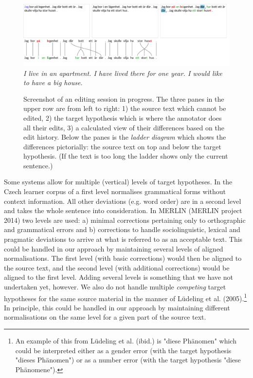 \documentclass[10pt, a4paper]{article}
\begin{document}
\begin{figure}
\includegraphics[width=\textwidth, trim={0 1cm 0 0}, clip]{screenshot.pdf}
\emph{\small I live in an apartment. I have lived there for one year. I would like to have a big house.}
\caption{Screenshot of an editing session in progress. The three panes in the upper row are from left to right:
1) the source text which cannot be edited,
2) the target hypothesis which is where the annotator does all their edits,
3) a calculated view of their differences based on the edit history.
Below the panes is the \emph{ladder diagram} which shows the differences
pictorially: the source text on top and below the target hypothesis.
(If the text is too long the ladder shows only the current sentence.)
\label{fig:screenshot}
}
\end{figure}

Some systems allow for multiple (vertical) levels of target hypotheses. In the Czech learner corpus of \cite{Hana2014} a
first level normalises grammatical forms without context information. All other deviations (e.g. word order) are in a second level and takes the whole sentence into consideration.
In MERLIN (MERLIN project 2014) two levels are used: a) minimal corrections pertaining only to orthographic and grammatical errors and b) corrections to handle sociolinguistic, lexical and pragmatic deviations to arrive at what is referred to as an acceptable text. This could be handled in our approach by maintaining several levels of aligned normalisations. The first level (with basic corrections) would then be aligned to the source text, and the second level (with additional corrections) would be aligned to the first level. Adding several levels is something that we have not undertaken yet, however. We also do not handle multiple {\em competing} target hypotheses for the same source material in the manner of L{\"u}deling et al. (2005).\footnote{An example of this from L{\"u}deling et al. (ibid.) is "diese Ph{\"a}nomen" which could be interpreted either as a gender error (with the target hypothesis "dieses Ph{\"a}nomen") or as a number error (with the target hypothesis "diese Ph{\"a}nomene").} In principle, this could be handled in our approach by maintaining different normalisations on the same level for a given part of the source text.
\end{document}
